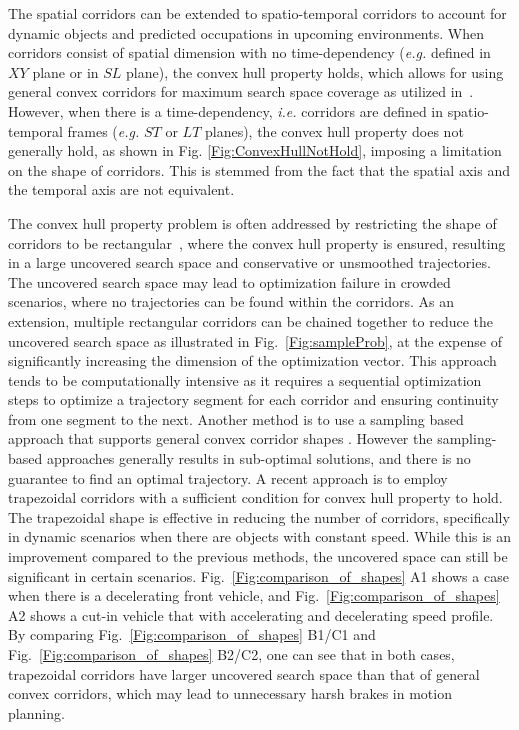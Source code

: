 The spatial corridors can be extended to spatio-temporal corridors to account for dynamic objects and predicted occupations in upcoming environments. When corridors consist of spatial dimension with no time-dependency (\textit{e.g.} defined in $XY$ plane or in $SL$ plane), the convex hull property holds, which allows for using general convex corridors for maximum search space coverage as utilized in~\cite{liu2018convex}.
However, when there is a time-dependency, \textit{i.e.} corridors are defined in spatio-temporal frames (\textit{e.g.} $ST$ or $LT$ planes), the convex hull property does not generally hold, as shown in Fig. \ref{Fig:ConvexHullNotHold}, imposing a limitation on the shape of corridors. This is stemmed from the fact that the spatial axis and the temporal axis are not equivalent. 

The convex hull property problem is often addressed by restricting the shape of corridors to be rectangular~\cite{ding2019safe}, where the convex hull property is ensured, resulting in a large uncovered search space and conservative or unsmoothed trajectories. The uncovered search space may lead to optimization failure in crowded scenarios, where no trajectories can be found within the corridors. As an extension, multiple rectangular corridors can be chained together to reduce the uncovered search space as illustrated in Fig.~\ref{Fig:sampleProb}, at the expense of significantly increasing the dimension of the optimization vector. This approach tends to be computationally intensive as it requires a sequential optimization steps to optimize a trajectory segment for each corridor and ensuring continuity from one segment to the next. Another method is to use a sampling based approach that supports general convex corridor shapes \cite{moghadam2020autonomous}. However the sampling-based approaches generally results in sub-optimal solutions, and there is no guarantee to find an optimal trajectory. A recent approach is to employ trapezoidal corridors \cite{li2021speed} with a sufficient condition for convex hull property to hold. The trapezoidal shape is effective in reducing the number of corridors, specifically in dynamic scenarios when there are objects with constant speed. While this is an improvement compared to the previous methods, the uncovered space can still be significant in certain scenarios. Fig.~\ref{Fig:comparison_of_shapes} A1 shows a case when there is a decelerating front vehicle, and Fig.~\ref{Fig:comparison_of_shapes} A2 shows a cut-in vehicle that with accelerating and decelerating speed profile. By comparing Fig.~\ref{Fig:comparison_of_shapes} B1/C1 and Fig.~\ref{Fig:comparison_of_shapes} B2/C2, one can see that in both cases, trapezoidal corridors have larger uncovered search space than that of general convex corridors, which may lead to unnecessary harsh brakes in motion planning.


